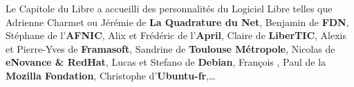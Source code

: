 Le Capitole du Libre a accueilli des personnalités du Logiciel Libre telles que Adrienne Charmet ou Jérémie  de \textbf{La Quadrature du Net}, Benjamin  de \textbf{FDN}, Stéphane  de l'\textbf{AFNIC}, Alix  et Frédéric  de l'\textbf{April}, Claire  de \textbf{LiberTIC}, Alexis  et Pierre-Yves  de \textbf{Framasoft}, Sandrine  de \textbf{Toulouse Métropole}, Nicolas  de \textbf{eNovance \& RedHat}, Lucas  et Stefano  de \textbf{Debian}, François , Paul  de la \textbf{Mozilla Fondation}, Christophe  d'\textbf{Ubuntu-fr},\dots
